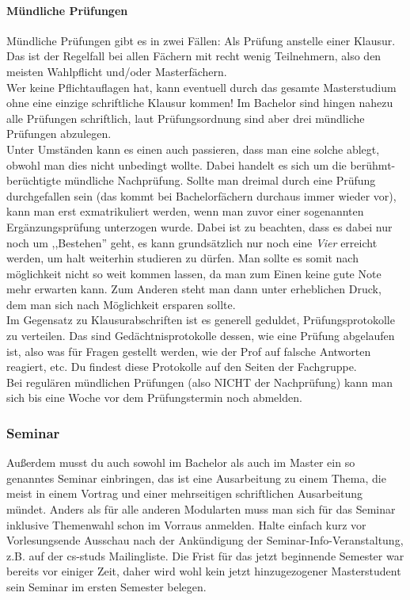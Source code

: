 \begin{multicols}{2}
	\paragraph*{Mündliche Prüfungen}
	Mündliche Prüfungen gibt es in zwei Fällen: Als Prüfung anstelle einer Klausur. Das ist der Regelfall bei allen Fächern mit recht wenig Teilnehmern, also den meisten Wahlpflicht und/oder Masterfächern. \\ 
	Wer keine Pflichtauflagen hat, kann eventuell durch das gesamte Masterstudium ohne eine einzige schriftliche Klausur kommen! Im Bachelor sind hingen nahezu alle Prüfungen schriftlich, laut Prüfungsordnung sind aber drei mündliche Prüfungen abzulegen. \\
	Unter Umständen kann es einen auch passieren, dass man eine solche ablegt, obwohl man dies nicht unbedingt wollte. Dabei handelt es sich um die berühmt-berüchtigte mündliche Nachprüfung. Sollte man dreimal durch eine Prüfung durchgefallen sein (das kommt bei Bachelorfächern durchaus immer wieder vor), kann man erst exmatrikuliert werden, wenn man zuvor einer sogenannten Ergänzungsprüfung unterzogen wurde. Dabei ist zu beachten, dass es dabei nur noch um ,,Bestehen'' geht, es kann grundsätzlich nur noch eine \emph{Vier} erreicht werden, um halt weiterhin studieren zu dürfen. Man sollte es somit nach möglichkeit nicht so weit kommen lassen, da man zum Einen keine gute Note mehr erwarten kann. Zum Anderen steht man dann unter erheblichen Druck, dem man sich nach Möglichkeit ersparen sollte.\\
	Im Gegensatz zu Klausurabschriften ist es generell geduldet, Prüfungsprotokolle zu verteilen. Das sind Gedächtnisprotokolle dessen, wie eine Prüfung abgelaufen ist, also was für Fragen gestellt werden, wie der Prof auf falsche Antworten reagiert, etc. Du findest diese Protokolle auf den Seiten der Fachgruppe.\\
	Bei regulären mündlichen Prüfungen (also NICHT der Nachprüfung) kann man sich bis eine Woche vor dem Prüfungstermin noch abmelden.

	\subsubsection{Seminar}
	Außerdem musst du auch sowohl im Bachelor als auch im Master ein so genanntes Seminar einbringen, das ist eine Ausarbeitung zu einem Thema, die meist in einem Vortrag und einer mehrseitigen schriftlichen Ausarbeitung mündet. Anders als für alle anderen Modularten muss man sich für das Seminar inklusive Themenwahl schon im Vorraus anmelden. Halte einfach kurz vor Vorlesungsende Ausschau nach der Ankündigung der Seminar-Info-Veranstaltung, z.B. auf der cs-studs Mailingliste. Die Frist für das jetzt beginnende Semester war bereits vor einiger Zeit, daher wird wohl kein jetzt hinzugezogener Masterstudent sein Seminar im ersten Semester belegen.


\end{multicols}
